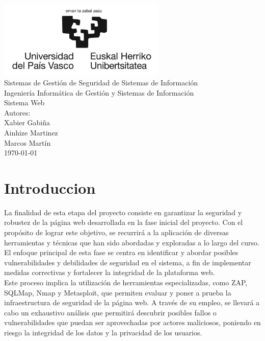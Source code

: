 \documentclass{report}
\begin{document}
    \begin{titlepage}
        \centering
        \includegraphics[width=0.6\textwidth]{./img/miscelanio/logo.jpg}\\
        \vspace{1cm}
        \LARGE Sistemas de Gestión de Seguridad de Sistemas de Información\\
        \vspace{0.5cm}
        \Large Ingeniería Informática de Gestión y Sistemas de Información\\
        \vspace{3cm}
        \Huge Sistema Web\\
        \vspace{2.5cm}
        \Large Autores:\\
        \vspace{0.2cm}
        \large Xabier Gabiña\\
        \large Ainhize Martinez\\
        \large Marcos Martín\\
        \vfill
        \today
    \end{titlepage}
    \tableofcontents
    \chapter{Introduccion}
        La finalidad de esta etapa del proyecto consiste en garantizar la seguridad y robustez de la página web desarrollada en la fase inicial del proyecto. Con el propósito de lograr este objetivo, se recurrirá a la aplicación de diversas herramientas y técnicas que han sido abordadas y exploradas a lo largo del curso. El enfoque principal de esta fase se centra en identificar y abordar posibles vulnerabilidades y debilidades de seguridad en el sistema, a fin de implementar medidas correctivas y fortalecer la integridad de la plataforma web.\\
        
        Este proceso implica la utilización de herramientas especializadas, como ZAP, SQLMap, Nmap y Metasploit, que permiten evaluar y poner a prueba la infraestructura de seguridad de la página web. A través de su empleo, se llevará a cabo un exhaustivo análisis que permitirá descubrir posibles fallos o vulnerabilidades que puedan ser aprovechadas por actores maliciosos, poniendo en riesgo la integridad de los datos y la privacidad de los usuarios.\\
        
\end{document}
